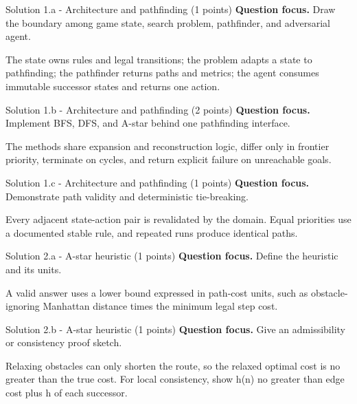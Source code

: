 \documentclass[aspectratio=169,11pt]{beamer}
\begin{document}
\begin{frame}{Solution 1.a - Architecture and pathfinding (1 points)}
\small
\textbf{Question focus.} Draw the boundary among game state, search problem, pathfinder, and adversarial agent.

\vspace{0.25cm}
\answerlabel The state owns rules and legal transitions; the problem adapts a state to pathfinding; the pathfinder returns paths and metrics; the agent consumes immutable successor states and returns one action.
\end{frame}

\begin{frame}{Solution 1.b - Architecture and pathfinding (2 points)}
\small
\textbf{Question focus.} Implement BFS, DFS, and A-star behind one pathfinding interface.

\vspace{0.25cm}
\answerlabel The methods share expansion and reconstruction logic, differ only in frontier priority, terminate on cycles, and return explicit failure on unreachable goals.
\end{frame}

\begin{frame}{Solution 1.c - Architecture and pathfinding (1 points)}
\small
\textbf{Question focus.} Demonstrate path validity and deterministic tie-breaking.

\vspace{0.25cm}
\answerlabel Every adjacent state-action pair is revalidated by the domain. Equal priorities use a documented stable rule, and repeated runs produce identical paths.
\end{frame}

\begin{frame}{Solution 2.a - A-star heuristic (1 points)}
\small
\textbf{Question focus.} Define the heuristic and its units.

\vspace{0.25cm}
\answerlabel A valid answer uses a lower bound expressed in path-cost units, such as obstacle-ignoring Manhattan distance times the minimum legal step cost.
\end{frame}

\begin{frame}{Solution 2.b - A-star heuristic (1 points)}
\small
\textbf{Question focus.} Give an admissibility or consistency proof sketch.

\vspace{0.25cm}
\answerlabel Relaxing obstacles can only shorten the route, so the relaxed optimal cost is no greater than the true cost. For local consistency, show h(n) no greater than edge cost plus h of each successor.
\end{frame}
\end{document}
